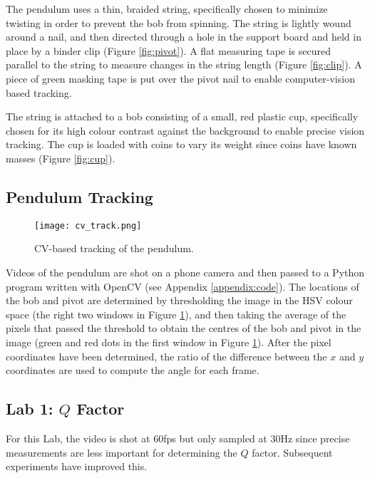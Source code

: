 \documentclass[aps,twocolumn,secnumarabic,nobalancelastpage,amsmath,amssymb,nofootinbib,floatfix,letterpaper]{revtex4}
\begin{document}
The pendulum uses a thin, braided string, specifically chosen to minimize twisting in order to prevent the bob from
spinning. The string is lightly wound around a nail, and then directed through a hole in the support board and held
in place by a binder clip (Figure \ref{fig:pivot}). A flat measuring tape is secured parallel to the string to measure
changes in the string length (Figure \ref{fig:clip}). A piece of green masking tape is put over the pivot nail to enable
computer-vision based tracking.

The string is attached to a bob consisting of a small, red plastic cup, specifically chosen for its high colour contrast
against the background to enable precise vision tracking. The cup is loaded with coins to vary its weight since coins
have known masses (Figure \ref{fig:cup}).

\subsection{Pendulum Tracking}
\label{sec:tracking}

\begin{figure}[htb]
    \centering
    \texttt{[image: cv\_track.png]}
    \caption{CV-based tracking of the pendulum.}
    \label{fig:tracking}
\end{figure}

Videos of the pendulum are shot on a phone camera and then passed to a Python program written with OpenCV (see Appendix
\ref{appendix:code}). The locations of the bob and pivot are determined by thresholding the image in the HSV colour
space (the right two windows in Figure \ref{fig:tracking}), and then taking the average of the pixels that passed the
threshold to obtain the centres of the bob and pivot in the image (green and red dots in the first window in Figure
\ref{fig:tracking}). After the pixel coordinates have been determined, the ratio of the difference between the \(x\) and
\(y\) coordinates are used to compute the angle for each frame.

\subsection{Lab 1: \texorpdfstring{\(Q\)}{Q} Factor}
\label{sec:lab1_method}

For this Lab, the video is shot at 60fps but only sampled at 30Hz since precise measurements are less important for
determining the \(Q\) factor. Subsequent experiments have improved this.
\end{document}
